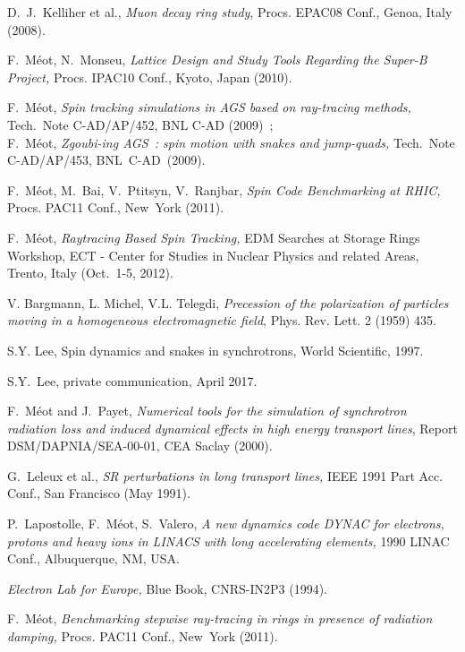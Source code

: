 \begin{thebibliography}{99}
D.~J.~Kelliher et al.,
\textsl{Muon decay ring study}, 
Procs. EPAC08 Conf., Genoa, Italy (2008). 

F.~M\'eot, N.~Monseu, 
\textsl{Lattice Design and Study Tools Regarding the Super-B Project, }
Procs. IPAC10 Conf., Kyoto, Japan (2010). 

F.~M\'eot, 
\textsl{Spin tracking simulations in AGS based on ray-tracing methods, }
Tech.~Note C-AD/AP/452, BNL C-AD (2009)~; \\ 
F.~M\'eot, 
\textsl{Zgoubi-ing AGS~: spin motion with  snakes and jump-quads,   } 
Tech.~Note C-AD/AP/453, BNL~C-AD~(2009). 

F.~M\'eot, M.~Bai, V.~Ptitsyn, V.~Ranjbar, 
\textsl{Spin Code Benchmarking at RHIC,} 
Procs. PAC11 Conf., New~York (2011). 

F.~M\'eot, 
\textsl{Raytracing Based Spin Tracking, } 
EDM Searches at Storage Rings Workshop, 
ECT - Center for Studies in Nuclear Physics and related Areas, 
Trento, Italy (Oct.~1-5, 2012). 


 V. Bargmann, L. Michel, V.L. Telegdi,
\textsl{Precession of the polarization of particles moving in a homogeneous electromagnetic field}, 
Phys. Rev. Lett. 2 (1959) 435.

 S.Y. Lee, Spin dynamics and snakes in synchrotrons, 
World Scientific, 1997.

 S.Y.~Lee, private communication, April 2017.

 F.~M\'eot and J.~Payet, 
\textsl{Numerical tools for the simulation of synchrotron radiation  
loss and induced dynamical effects in high energy transport lines},  
Report DSM/DAPNIA/SEA-00-01, CEA Saclay (2000). 

G.~Leleux et al., 
\textsl{SR perturbations in long transport lines, } 
IEEE 1991 Part Acc. Conf., San Francisco (May 1991). 

P.~Lapostolle, F.~M\'eot, S.~Valero, 
\textsl{A new dynamics code  DYNAC for electrons, protons and heavy ions in LINACS with long accelerating elements, } 
1990 LINAC Conf., Albuquerque, NM, USA. 

\textsl{Electron Lab for Europe, } 
Blue Book, CNRS-IN2P3 (1994). 

F.~M\'eot, 
\textsl{Benchmarking stepwise ray-tracing in rings in presence of radiation damping, }
Procs. PAC11 Conf., New~York (2011). 


\end{thebibliography}

